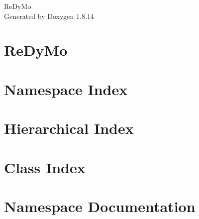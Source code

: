 \documentclass[twoside]{book}
\newcommand{\+}{\discretionary{\mbox{\scriptsize$\hookleftarrow$}}{}{}}
\newcommand{\clearemptydoublepage}{%
  \newpage{\pagestyle{empty}\cleardoublepage}%
}
\begin{document}
\hypersetup{pageanchor=false,
             bookmarksnumbered=true,
             pdfencoding=unicode
            }
\begin{titlepage}
\vspace*{7cm}
\begin{center}%
{\Large Re\+Dy\+Mo }\\
\vspace*{1cm}
{\large Generated by Doxygen 1.8.14}\\
\end{center}
\end{titlepage}
\clearemptydoublepage
{}
\tableofcontents
\clearemptydoublepage
{}
\hypersetup{pageanchor=true}

\chapter{Re\+Dy\+Mo}
\label{index}\hypertarget{index}{}
\chapter{Namespace Index}

\chapter{Hierarchical Index}

\chapter{Class Index}

\chapter{Namespace Documentation}













\end{document}
